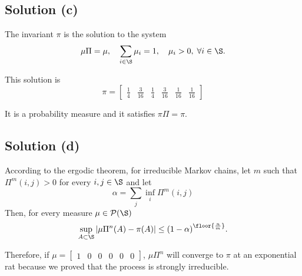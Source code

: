 \subsection*{Solution (c)}

The invariant $\pi$ is the solution to the system
\[ \mu\Pi = \mu,\hspace*{1em} \sum_{i\in\S}\mu_i = 1,\hspace*{1em} \mu_i > 0,\;\forall i\in\S. \]

This solution is
\[ \pi = \left[\begin{matrix}\frac{1}{4} & \frac{3}{16} & \frac{1}{4} & \frac{3}{16} & \frac{1}{16} & \frac{1}{16}\end{matrix}\right] \]

It is a probability measure and it satisfies $\pi \Pi = \pi$.

\subsection*{Solution (d)}

According to the ergodic theorem, for irreducible Markov chains, let $m$ such that $\Pi^m(i,j) > 0$ for every $i,j\in\S$ and let
\[ \alpha = \sum_{j} \inf_{i}\Pi^m(i,j) \]
Then, for every measure $\mu \in \mathcal{P}(\S)$
\[ \sup_{A\subset \S}|\mu\Pi^n(A)-\pi(A)| \leq {(1-\alpha)}^{\floor{\frac{n}{m}}} . \]

Therefore, if $\mu = \left[\begin{matrix}1 & 0 & 0 & 0 & 0 & 0\end{matrix}\right]$, $\mu\Pi^n$ will converge to $\pi$ at an exponential rat because we proved that the process is strongly irreducible.
